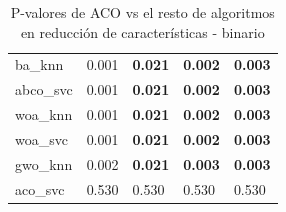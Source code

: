 \begin{table}[htb]
\begin{tabular}{lllll}
        ba\_knn    & 0.001     & \textbf{0.021} & \textbf{0.002} & \textbf{0.003} \\
        abco\_svc  & 0.001     & \textbf{0.021} & \textbf{0.002} & \textbf{0.003} \\
        woa\_knn   & 0.001     & \textbf{0.021} & \textbf{0.002} & \textbf{0.003} \\
        woa\_svc   & 0.001     & \textbf{0.021} & \textbf{0.002} & \textbf{0.003} \\
        gwo\_knn   & 0.002     & \textbf{0.021} & \textbf{0.003} & \textbf{0.003} \\
        aco\_svc   & 0.530     & 0.530          & 0.530          & 0.530          \\
        \bottomrule
    \end{tabular}
    \caption{P-valores de ACO vs el resto de algoritmos en reducción de características - binario}
    \label{tab:p-values_aco_rest}
\end{table}


